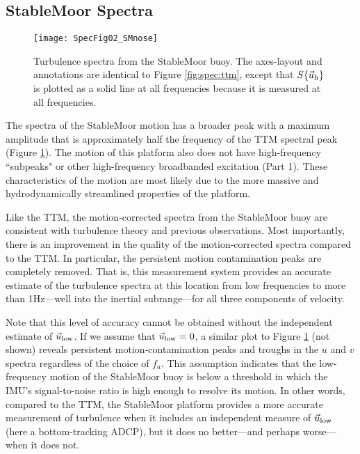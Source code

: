\subsection{StableMoor Spectra}

\begin{figure*}[th]
  \centering
  \texttt{[image: SpecFig02\_SMnose]}
  \caption{Turbulence spectra from the StableMoor buoy. The axes-layout and annotations are identical to Figure \ref{fig:spec:ttm}, except that $S\{\vec{u}_\mathrm{h}\}$ is plotted as a solid line at all frequencies because it is measured at all frequencies. }
  \label{fig:spec:sm}
\end{figure*}

The spectra of the StableMoor motion has a broader peak with a maximum amplitude that is approximately half the frequency of the TTM spectral peak (Figure \ref{fig:spec:sm}). The motion of this platform also does not have high-frequency ``subpeaks" or other high-frequency broadbanded excitation (Part 1).  These characteristics of the motion are most likely due to the more massive and hydrodynamically streamlined properties of the platform. 

Like the TTM, the motion-corrected spectra from the StableMoor buoy are consistent with turbulence theory and previous observations. Most importantly, there is an improvement in the quality of the motion-corrected spectra compared to the TTM. In particular, the persistent motion contamination peaks are completely removed. That is, this measurement system provides an accurate estimate of the turbulence spectra at this location from low frequencies to more than 1Hz---well into the inertial subrange---for all three components of velocity.

Note that this level of accuracy cannot be obtained without the independent estimate of $\vec{u}_\mathrm{low}$. If we assume that $\vec{u}_\mathrm{low}=0$, a similar plot to Figure \ref{fig:spec:sm} (not shown) reveals persistent motion-contamination peaks and troughs in the $u$ and $v$ spectra regardless of the choice of $f_a$. This assumption indicates that the low-frequency motion of the StableMoor buoy is below a threshold in which the IMU's signal-to-noise ratio is high enough to resolve its motion. In other words, compared to the TTM, the StableMoor platform provides a more accurate measurement of turbulence when it includes an independent measure of $\vec{u}_\mathrm{low}$ (here a bottom-tracking ADCP), but it does no better---and perhaps worse---when it does not.
%
%


